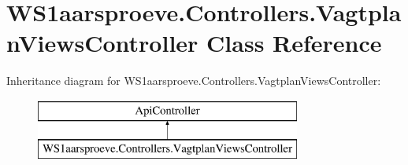 \hypertarget{class_w_s1aarsproeve_1_1_controllers_1_1_vagtplan_views_controller}{}\section{W\+S1aarsproeve.\+Controllers.\+Vagtplan\+Views\+Controller Class Reference}
\label{class_w_s1aarsproeve_1_1_controllers_1_1_vagtplan_views_controller}
Inheritance diagram for W\+S1aarsproeve.\+Controllers.\+Vagtplan\+Views\+Controller\+:\begin{figure}[H]
\begin{center}
\leavevmode
\includegraphics[height=2.000000cm]{class_w_s1aarsproeve_1_1_controllers_1_1_vagtplan_views_controller}
\end{center}
\end{figure}
